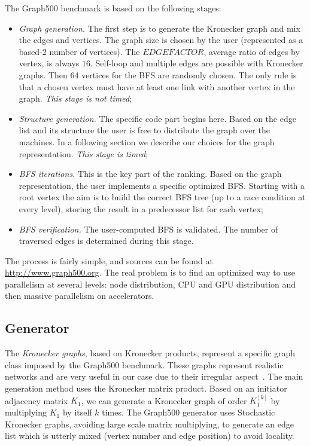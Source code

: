 The Graph500 benchmark is based on the following stages:
\begin{itemize}
	\item \textit{Graph generation.} The first step is to generate the Kronecker graph and mix the edges and vertices. 
	The graph size is chosen by the user (represented as a based-2 number of vertices). The $EDGEFACTOR$, average ratio of edges by vertex, is always $16$. 
	Self-loop and multiple edges are possible with Kronecker graphs.
	Then 64 vertices for the BFS are randomly chosen. 
	The only rule is that a chosen vertex must have at least one link with another vertex in the graph. \textit{This stage is not timed};
	\item \textit{Structure generation.} The specific code part begins here. 
	Based on the edge list and its structure the user is free to distribute the graph over the machines. 
	In a following section we describe our choices for the graph representation. \textit{This stage is timed};
	\item \textit{BFS iterations.} This is the key part of the ranking. Based on the graph representation, the user implements a specific optimized BFS. Starting with a root vertex the aim is to build the correct BFS tree (up to a race condition at every level), storing the result in a predecessor list for each vertex;
	\item \textit{BFS verification.} The user-computed BFS is validated. The number of traversed edges is determined during this stage.  
\end{itemize}

The process is fairly simple, and sources can be found at \url{http://www.graph500.org}.
The real problem is to find an optimized way to use parallelism at several levels: node distribution, CPU and GPU distribution and then massive parallelism on accelerators.



\subsection{Generator}

The \textit{Kronecker graphs}, based on Kronecker products, represent a specific graph class
imposed by the Graph500 benchmark. 
These graphs represent realistic networks and are very useful in our case due to their irregular aspect~\cite{leskovec2010kronecker}. 
The main generation method uses the Kronecker matrix product. 
Based on an initiator adjacency matrix $K_1$, we can generate a Kronecker graph of order $K_1^{[k]}$ by multiplying $K_1$ by itself $k$ times. 
The Graph500 generator uses Stochastic Kronecker graphs, avoiding large scale matrix multiplying, to generate an edge list which is utterly mixed (vertex number and edge position) to avoid locality. 

